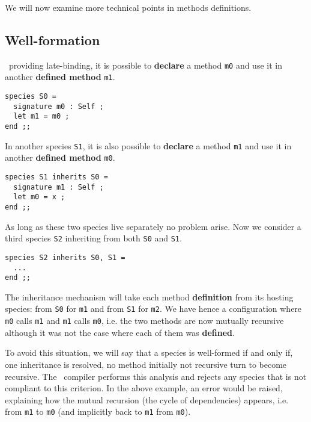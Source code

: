 


We will now examine more technical points in methods definitions.



\subsection{Well-formation}
\label{well-formation}
\focal\ providing late-binding, it is possible to {\bf declare} a
method {\tt m0} and use it in another {\bf defined method} {\tt m1}.

{\scriptsize
\begin{lstlisting}
species S0 =
  signature m0 : Self ;
  let m1 = m0 ;
end ;;
\end{lstlisting}
}

In another species {\tt S1}, it is also possible to {\bf declare} a
method {\tt m1} and use it in another {\bf defined method} {\tt m0}.
{\scriptsize
\begin{lstlisting}
species S1 inherits S0 =
  signature m1 : Self ;
  let m0 = x ;
end ;;
\end{lstlisting}
}

As long as these two species live separately no problem arise. Now we
consider a third species {\tt S2} inheriting from both {\tt S0} and
{\tt S1}.
{\scriptsize
\begin{lstlisting}
species S2 inherits S0, S1 =
  ...
end ;;
\end{lstlisting}
}

The inheritance mechanism will take each method {\bf definition} from
its hosting species: from {\tt S0} for {\tt m1} and from {\tt S1} for
{\tt m2}. We have hence a configuration where {\tt m0} calls {\tt m1}
and {\tt m1} calls {\tt m0}, i.e. the two methods are now mutually
recursive although it was not the case where each of them was
{\bf defined}.

To avoid this situation, we will say that a species is well-formed if
and only if, one inheritance is resolved, no method initially not
recursive turn to become recursive. The \focal\ compiler performs this
analysis and rejects any species that is not compliant to this
criterion. In the above example, an error would be raised, explaining
how the mutual recursion (the cycle of dependencies) appears,
i.e. from {\tt m1} to {\tt m0} (and implicitly back to {\tt m1} from
{\tt m0}).

